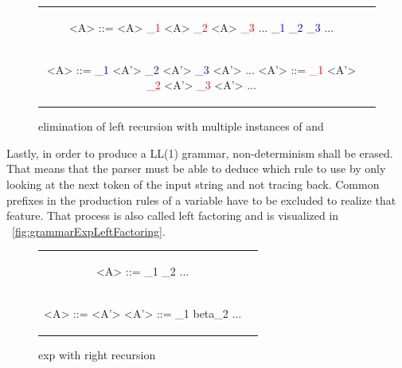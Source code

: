 \begin{figure}
	\label{grammarElimLRMultiple}
	\caption{elimination of left recursion with multiple instances of \alpha and \beta}

	\begin{center}
		\begin{tabular}{c c}
			\begin{grammar}
				<A> ::= <A> \textcolor{red}{\alpha_1}
				\alt <A> \textcolor{red}{\alpha_2}
				\alt <A> \textcolor{red}{\alpha_3}
				...
				\alt \textcolor{blue}{\beta_1}
				\alt \textcolor{blue}{\beta_2}
				\alt \textcolor{blue}{\beta_3}
				...
			\end{grammar}
			\\
			\begin{grammar}
				<A> ::= \textcolor{blue}{\beta_1} <A'>
				\alt \textcolor{blue}{\beta_2} <A'>
				\alt \textcolor{blue}{\beta_3} <A'>
				...
				<A'> ::= \textcolor{red}{\alpha_1} <A'>
				\alt \textcolor{red}{\alpha_2} <A'>
				\alt \textcolor{red}{\alpha_3} <A'>
				...
				\alt \epsilon
			\end{grammar}
		\end{tabular}
	\end{center}
\end{figure}

Lastly, in order to produce a LL(1) grammar, non-determinism shall be erased. That means that the parser must be able to deduce which rule to use by only looking at the next token of the input string and not tracing back. Common prefixes in the production rules of a variable have to be excluded to realize that feature. That process is also called left factoring and is visualized in ~\ref{fig:grammarExpLeftFactoring}.

\begin{figure}
	\label{grammarExpRR}
	\caption{exp with right recursion}

	\begin{center}
		\begin{tabular}{c c}
			\begin{grammar}
				<A> ::= \alpha \beta_1
				\alt \alpha \beta_2
				...
			\end{grammar}
			\\
			\begin{grammar}
				<A> ::= \alpha <A'>
				<A'> ::= \beta_1
				\alt beta_2
				...
			\end{grammar}
		\end{tabular}
	\end{center}
\end{figure}

